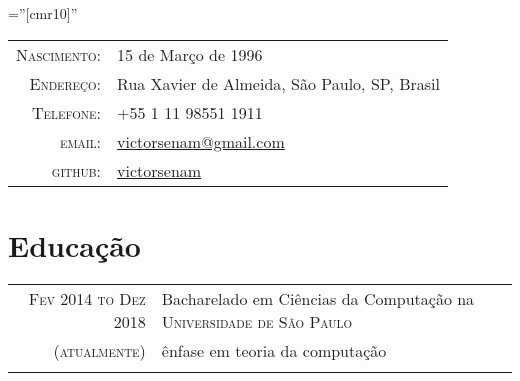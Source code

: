 \documentclass[a4paper,10pt]{article} %
\begin{document}
\pagestyle{empty} %

\font\fb=''[cmr10]'' %


\par{\bigskip\par} %


\begin{tabular}{rl}
\textsc{Nascimento:} & 15 de Março de 1996 \\
\textsc{Endereço:} & Rua Xavier de Almeida, São Paulo, SP, Brasil \\
\textsc{Telefone:} & +55 1 11 98551 1911\\
\textsc{email:} & \href{mailto:victorsenam@gmail.com}{victorsenam@gmail.com} \\
\textsc{github:} & \href{https://github.com/victorsenam}{victorsenam} \\
\end{tabular}


\section{Educação}

\begin{tabular}{r|p{11cm}}
\textsc{Fev 2014 to Dez 2018}   & Bacharelado em Ciências da Computação na \textsc{Universidade de São Paulo}\\
\textsc{(atualmente)}              & \footnotesize{ênfase em teoria da computação} \\
\multicolumn{2}{c}{} \\
\end{tabular}


\end{document}
